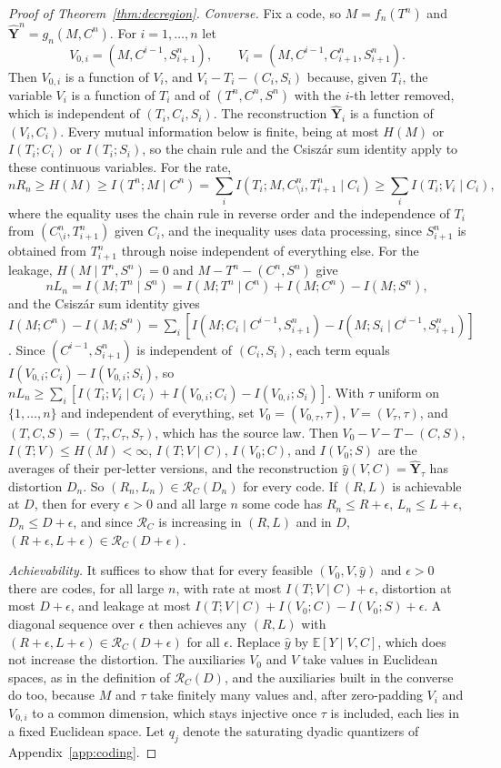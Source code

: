 \documentclass[11pt,onecolumn]{IEEEtran}
\newcommand{\E}{\mathbb{E}}
\newcommand{\hY}{\hat{\mathbf Y}}
\begin{document}
\begin{proof}[Proof of Theorem~\ref{thm:decregion}]
\emph{Converse.} Fix a code, so $M=f_n(T^n)$ and $\hY^n=g_n(M,C^n)$. For
$i=1,\dots,n$ let
\[
V_{0,i}=(M,C^{i-1},S_{i+1}^n),\qquad V_i=(M,C^{i-1},C_{i+1}^n,S_{i+1}^n).
\]
Then $V_{0,i}$ is a function of $V_i$, and $V_i-T_i-(C_i,S_i)$ because,
given $T_i$, the variable $V_i$ is a function of $T_i$ and of
$(T^n,C^n,S^n)$ with the $i$-th letter removed, which is independent of
$(T_i,C_i,S_i)$. The reconstruction $\hY_i$ is a function of $(V_i,C_i)$.
Every mutual information below is finite, being at most $H(M)$ or
$I(T_i;C_i)$ or $I(T_i;S_i)$, so the chain rule and the Csisz\'ar sum
identity apply to these continuous variables. For the rate,
\[
nR_n\ge H(M)\ge I(T^n;M\mid C^n)=\sum_iI(T_i;M,C^{n}_{\setminus i},T_{i+1}^n\mid C_i)
\ge\sum_iI(T_i;V_i\mid C_i),
\]
where the equality uses the chain rule in reverse order and the
independence of $T_i$ from $(C^n_{\setminus i},T_{i+1}^n)$ given $C_i$,
and the inequality uses data processing, since $S_{i+1}^n$ is obtained
from $T_{i+1}^n$ through noise independent of everything else. For the
leakage, $H(M\mid T^n,S^n)=0$ and $M-T^n-(C^n,S^n)$ give
\[
nL_n=I(M;T^n\mid S^n)=I(M;T^n\mid C^n)+I(M;C^n)-I(M;S^n),
\]
and the Csisz\'ar sum identity gives
$I(M;C^n)-I(M;S^n)=\sum_i[I(M;C_i\mid C^{i-1},S_{i+1}^n)-I(M;S_i\mid C^{i-1},S_{i+1}^n)]$.
Since $(C^{i-1},S_{i+1}^n)$ is independent of $(C_i,S_i)$, each term equals
$I(V_{0,i};C_i)-I(V_{0,i};S_i)$, so
$nL_n\ge\sum_i[I(T_i;V_i\mid C_i)+I(V_{0,i};C_i)-I(V_{0,i};S_i)]$. With $\tau$
uniform on $\{1,\dots,n\}$ and independent of everything, set
$V_0=(V_{0,\tau},\tau)$, $V=(V_\tau,\tau)$, and $(T,C,S)=(T_\tau,C_\tau,S_\tau)$, which has the
source law. Then $V_0-V-T-(C,S)$, $I(T;V)\le H(M)<\infty$,
$I(T;V\mid C)$, $I(V_0;C)$, and $I(V_0;S)$ are the averages of their
per-letter versions, and the reconstruction $\hat y(V,C)=\hY_\tau$ has
distortion $D_n$. So $(R_n,L_n)\in\mathcal R_C(D_n)$ for every code. If
$(R,L)$ is achievable at $D$, then for every $\epsilon>0$ and all large $n$
some code has $R_n\le R+\epsilon$, $L_n\le L+\epsilon$, $D_n\le D+\epsilon$,
and since $\mathcal R_C$ is increasing in $(R,L)$ and in $D$,
$(R+\epsilon,L+\epsilon)\in\mathcal R_C(D+\epsilon)$.

\emph{Achievability.} It suffices to show that for every feasible
$(V_0,V,\hat y)$ and $\epsilon>0$ there are codes, for all large $n$, with
rate at most $I(T;V\mid C)+\epsilon$, distortion at most $D+\epsilon$, and
leakage at most $I(T;V\mid C)+I(V_0;C)-I(V_0;S)+\epsilon$. A diagonal
sequence over $\epsilon$ then achieves any $(R,L)$ with
$(R+\epsilon,L+\epsilon)\in\mathcal R_C(D+\epsilon)$ for all $\epsilon$. Replace
$\hat y$ by $\E[Y\mid V,C]$, which does not increase the distortion.
The auxiliaries $V_0$ and $V$ take values in Euclidean spaces, as in the
definition of $\mathcal R_C(D)$, and the auxiliaries built in the converse
do too, because $M$ and $\tau$ take finitely many values and, after
zero-padding $V_i$ and $V_{0,i}$ to a common dimension, which stays injective
once $\tau$ is included, each lies in a fixed Euclidean space. Let $q_j$
denote the saturating dyadic quantizers of Appendix~\ref{app:coding}.


\end{proof}
\end{document}

